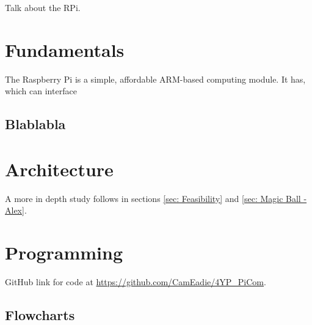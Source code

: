 \documentclass[../main.tex]{subfiles}
\begin{document}
Talk about the RPi.


\section{Fundamentals}

The Raspberry Pi is a simple, affordable ARM-based computing module. It has, which can interface

\subsection{Blablabla}

	
\section{Architecture}
A more in depth study follows in sections \ref{sec: Feasibility} and \ref{sec: Magic Ball - Alex}.


\section{Programming}
GitHub link for code at \url{https://github.com/CamEadie/4YP_PiCom}.

\subsection{Flowcharts}
\end{document}
